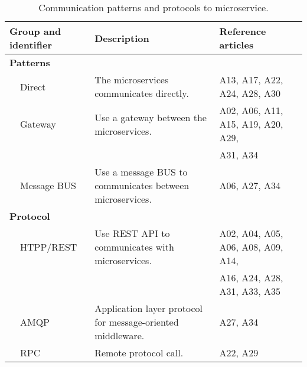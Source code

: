 \begin{table*}[tb]
\centering
\renewcommand{\arraystretch}{1.8}
\caption{Communication patterns and protocols to microservice.}
\label{table_SG4}
\begin{tabular}{llll}
\hline
\multicolumn{2}{l}{Group and identifier} & Description & Reference articles \\ \hline

\multicolumn{2}{l}{\textbf{Patterns}} &  &  \\
 & Direct & The microservices communicates directly. & A13, A17, A22, A24, A28, A30 \\
 & Gateway & Use a gateway between the microservices. & A02, A06, A11, A15, A19, A20, A29, \\
 &  &  & A31, A34 \\
 & Message BUS & Use a message BUS to communicates between microservices. &  A06, A27, A34 \\
 
\multicolumn{2}{l}{\textbf{Protocol}} &  &  \\
 & HTPP/REST & Use REST API to communicates with microservices. & A02, A04, A05, A06, A08, A09, A14,  \\
 &  &  & A16, A24, A28, A31, A33, A35 \\
 & AMQP & Application layer protocol for message-oriented middleware. & A27, A34 \\
 & RPC & Remote protocol call. & A22, A29 \\ \hline
\end{tabular}
\end{table*}